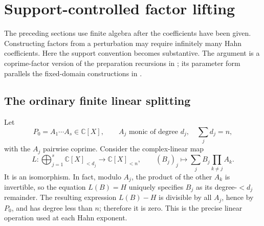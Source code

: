 \documentclass[11pt,letterpaper]{article}
\numberwithin{equation}{section}
\theoremstyle{definition}
\theoremstyle{remark}
\newcommand{\C}{\mathbb C}
\begin{document}
\section{Support-controlled factor lifting}\label{sec:hensel}
The preceding sections use finite algebra after the coefficients have been
given. Constructing factors from a perturbation may require infinitely
many Hahn coefficients. Here the support convention becomes substantive.
The argument is a coprime-factor version of the preparation recursions in
\cite{SourceAnalysis,SourceGlobal}; its parameter form parallels the
fixed-domain constructions in \cite{SourceResearch}.

\subsection{The ordinary finite linear splitting}
Let
\[
 P_0=A_1\cdots A_s\in\C[X],\qquad
 A_j\text{ monic of degree }d_j,\quad \sum_jd_j=n,
\]
with the $A_j$ pairwise coprime. Consider the complex-linear map
\begin{equation}\label{eq:factorlinear}
 L:\bigoplus_{j=1}^s\C[X]_{<d_j}\longrightarrow\C[X]_{<n},
 \qquad
 (B_j)_j\longmapsto\sum_j B_j\prod_{k\ne j}A_k.
\end{equation}
It is an isomorphism. In fact, modulo $A_j$, the product of the other
$A_k$ is invertible, so the equation $L(B)=H$ uniquely specifies $B_j$
as its degree-$<d_j$ remainder. The resulting expression $L(B)-H$ is
divisible by all $A_j$, hence by $P_0$, and has degree less than $n$;
therefore it is zero. This is the precise linear operation used at each
Hahn exponent.
\end{document}
